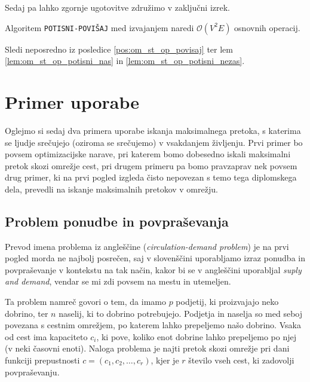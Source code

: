 \documentclass[mat1]{fmfdelo}
\begin{document}
Sedaj pa lahko zgornje ugotovitve združimo v zaključni izrek.

\begin{izrek}
Algoritem \texttt{POTISNI-POVIŠAJ} med izvajanjem naredi $\mathcal{O}(V^2E)$ osnovnih operacij.
\end{izrek}

\begin{dokaz}
Sledi neposredno iz posledice \ref{pos:om_st_op_povisaj} ter lem \ref{lem:om_st_op_potisni_nas} in \ref{lem:om_st_op_potisni_nezas}.
\end{dokaz}


\section{Primer uporabe}


Oglejmo si sedaj dva primera uporabe iskanja maksimalnega pretoka, s katerima se ljudje srečujejo (oziroma se srečujemo) v vsakdanjem življenju. Prvi primer bo povsem
optimizacijske narave, pri katerem bomo dobesedno iskali maksimalni pretok skozi omrežje cest, pri drugem primeru
pa bomo pravzaprav nek povsem drug primer, ki na prvi pogled izgleda čisto nepovezan s temo tega diplomskega
dela, prevedli na iskanje maksimalnih pretokov v omrežju.


\subsection{Problem ponudbe in povpraševanja}

Prevod imena problema iz angleščine (\textit{circulation-demand problem}) je na prvi pogled morda ne najbolj posrečen,
saj v slovenščini uporabljamo izraz ponudba in povpraševanje v kontekstu na tak način, kakor bi se v angleščini uporabljal
\textit{suply and demand}, vendar se mi zdi povsem na mestu in utemeljen.

Ta problem namreč govori o tem, da imamo $p$ podjetij, ki proizvajajo neko dobrino, ter $n$ naselij, ki to dobrino potrebujejo.
Podjetja in naselja so med seboj povezana s cestnim omrežjem, po katerem lahko prepeljemo našo dobrino. Vsaka od cest ima kapaciteto $c_i$,
ki pove, koliko enot dobrine lahko prepeljemo po njej (v neki časovni enoti). Naloga problema je najti pretok skozi omrežje pri dani funkciji
prepustnosti $c = (c_1, c_2, \dotsc, c_r)$, kjer je $r$ število vseh cest, ki zadovolji povpraševanju.\\
\end{document}
